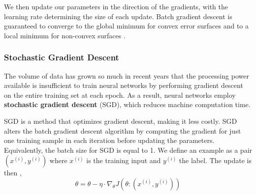 \documentclass{article}
\begin{document}
   We then update our parameters in the direction of the gradients, with the learning rate determining the size of each update. Batch gradient descent is guaranteed to converge to the global minimum for convex error surfaces and to a local minimum for non-convex surfaces \citep{ruder2017overview}.
\subsubsection{Stochastic Gradient Descent}%
  \label{subsub:Stochastic Gradient Descent}

The volume of data has grown so much in recent years that the processing power available is insufficient to train neural networks by performing gradient descent on the entire training set at each epoch. As a result, neural networks employ \textbf{stochastic gradient descent} (SGD), which reduces machine computation time. 

   SGD is a method that optimizes gradient descent, making it less costly. SGD alters the batch gradient descent algorithm by computing the gradient for just one training sample in each iteration before updating the parameters. Equivalently, the batch size for SGD is equal to 1. We define an example as a pair $(x^{(i)}, y^{(i)})$ where $x^{(i)}$ is the training input and $y^{(i)}$ the label. The update is then \citep{ruder2017overview},
   $$\theta = \theta - \eta \cdot \nabla_\theta J(\theta :(x^{(i)}, y^{(i)}) ) $$
\end{document}
